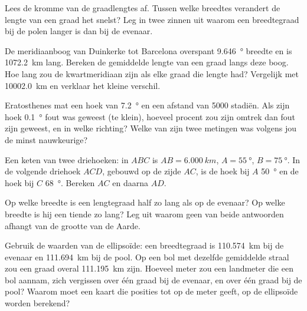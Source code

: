 \begin{exercise}[$\star\star$]\label{exo:g10:measuring-the-earth:10}
Lees de kromme van de graadlengtes af. Tussen welke breedtes verandert de
lengte van een graad het snelst? Leg in twee zinnen uit waarom een breedtegraad
bij de polen langer is dan bij de evenaar.
\end{exercise}

\begin{exercise}[$\star\star$]\label{exo:g10:measuring-the-earth:11}
De meridiaanboog van Duinkerke tot Barcelona overspant \qty{9.646}{\degree}
breedte en is \qty{1072.2}{km} lang. Bereken de gemiddelde lengte van een graad
langs deze boog. Hoe lang zou de kwartmeridiaan zijn als elke graad die lengte
had? Vergelijk met \qty{10002.0}{km} en verklaar het kleine verschil.
\end{exercise}

\begin{exercise}[$\star\star\star$]\label{exo:g10:measuring-the-earth:12}
Eratosthenes mat een hoek van \qty{7.2}{\degree} en een afstand van 5000
stadiën. Als zijn hoek \qty{0.1}{\degree} fout was geweest (te klein), hoeveel
procent zou zijn omtrek dan fout zijn geweest, en in welke richting? Welke van
zijn twee metingen was volgens jou de minst nauwkeurige?
\end{exercise}

\begin{exercise}[$\star\star\star$]\label{exo:g10:measuring-the-earth:13}
Een keten van twee driehoeken: in $ABC$ is $AB = \qty{6.000}{km}$,
$A = \qty{55}{\degree}$, $B = \qty{75}{\degree}$. In de volgende driehoek $ACD$,
gebouwd op de zijde $AC$, is de hoek bij $A$ \qty{50}{\degree} en de hoek bij
$C$ \qty{68}{\degree}. Bereken $AC$ en daarna $AD$.
\end{exercise}

\begin{exercise}[$\star\star\star$]\label{exo:g10:measuring-the-earth:14}
Op welke breedte is een lengtegraad half zo lang als op de evenaar? Op welke
breedte is hij een tiende zo lang? Leg uit waarom geen van beide antwoorden
afhangt van de grootte van de Aarde.
\end{exercise}

\begin{exercise}[$\star\star\star$]\label{exo:g10:measuring-the-earth:15}
Gebruik de waarden van de ellipsoïde: een breedtegraad is \qty{110.574}{km}
bij de evenaar en \qty{111.694}{km} bij de pool. Op een bol met dezelfde
gemiddelde straal zou een graad overal \qty{111.195}{km} zijn. Hoeveel meter
zou een landmeter die een bol aannam, zich vergissen over één graad bij de
evenaar, en over één graad bij de pool? Waarom moet een kaart die posities tot
op de meter geeft, op de ellipsoïde worden berekend?
\end{exercise}

